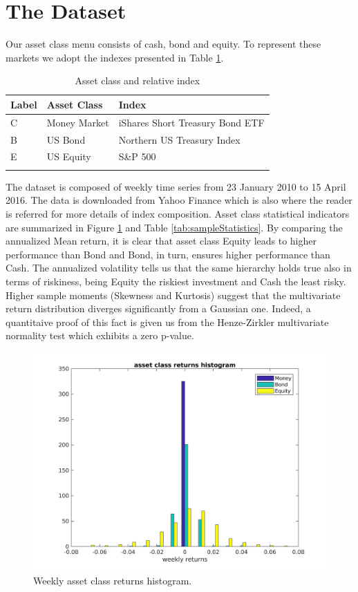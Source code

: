 \section{The Dataset}\label{sec:The_Dataset}
Our asset class menu consists of cash, bond and equity. To represent these markets we adopt the indexes presented in Table \ref{tab:indexes}.
\begin{table}[]
	\centering
	\begin{tabular}{@{}lll@{}} \toprule
		Label & Asset Class & Index\\ \midrule
		C & Money Market & iShares Short Treasury Bond ETF\\
		\addlinespace[0.5em]
		B & US Bond  & Northern US Treasury Index \\
		\addlinespace[0.5em]
	    E &	US Equity &  {S\&P 500}\\ \bottomrule
		\addlinespace[0.5em]
	\end{tabular}
	\caption{Asset class and relative index}
	\label{tab:indexes}
\end{table}
The dataset is composed of weekly time series from 23 January 2010 to 15 April 2016. The data is downloaded from Yahoo Finance which is also where the reader is referred for more details of index composition. Asset class statistical indicators are summarized in Figure \ref{fig:assetclassReturns} and Table \ref{tab:sampleStatistics}. By comparing the annualized Mean return, it is clear that asset class Equity leads to higher performance than Bond and Bond, in turn, ensures higher performance than Cash. The annualized volatility tells us that the same hierarchy holds true also in terms of riskiness, being Equity the riskiest investment and Cash the least risky. Higher sample moments (Skewness and Kurtosis) suggest that the multivariate return distribution diverges significantly from a Gaussian one. Indeed, a quantitaive proof of this fact is given us from the Henze-Zirkler multivariate normality test which exhibits a zero p-value. 
\begin{figure}[h]\label{fig:assetclassReturns}
	\centering
	\includegraphics[scale=0.6]{Images/ReturnsHist.png}
	\caption{Weekly asset class returns histogram.}
\end{figure}
